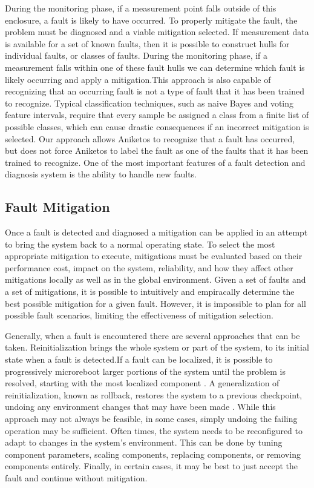 During the monitoring phase, if a measurement point falls outside of this enclosure, a fault is likely to have occurred. To properly mitigate the fault, the problem must be diagnosed \cite{6100108} and a viable mitigation selected. If measurement data is available for a set of known faults, then it is possible to construct hulls for individual faults, or classes of faults. During the monitoring phase, if a measurement falls within one of these fault hulls we can determine which fault is likely occurring and apply a mitigation.This approach is also capable of recognizing that an occurring fault is not a type of fault that it has been trained to recognize. Typical classification techniques, such as naive Bayes and voting feature intervals\cite{Demiroz1997}, require that every sample be assigned a class from a finite list of possible classes, which can cause drastic consequences if an incorrect mitigation is selected. Our approach allows Aniketos to recognize that a fault has occurred, but does not force Aniketos to label the fault as one of the faults that it has been trained to recognize. One of the most important features of a fault detection and diagnosis system is the ability to handle new faults.

\subsection{Fault Mitigation}
\label{sub:fault_mitigation}
Once a fault is detected and diagnosed a mitigation can be applied in an attempt to bring the system back to a normal operating state. To select the most appropriate mitigation to execute, mitigations must be evaluated based on their performance cost, impact on the system, reliability, and how they affect other mitigations locally as well as in the global environment. Given a set of faults and a set of mitigations, it is possible to intuitively and empiracally determine the best possible mitigation for a given fault. However, it is impossible to plan for all possible fault scenarios, limiting the effectiveness of mitigation selection.

Generally, when a fault is encountered there are several approaches that can be taken. Reinitialization brings the whole system or part of the system, to its initial state when a fault is detected.If a fault can be localized, it is possible to progressively microreboot larger portions of the system until the problem is resolved, starting with the most localized component \cite{1251257}. A generalization of reinitialization, known as rollback, restores the system to a previous checkpoint, undoing any environment changes that may have been made \cite{1095833}. While this approach may not always be feasible, in some cases, simply undoing the failing operation may be sufficient. Often times, the system needs to be reconfigured to adapt to changes in the system's environment. This can be done by tuning component parameters, scaling components, replacing components, or removing components entirely. Finally, in certain cases, it may be best to just accept the fault and continue without mitigation. 

